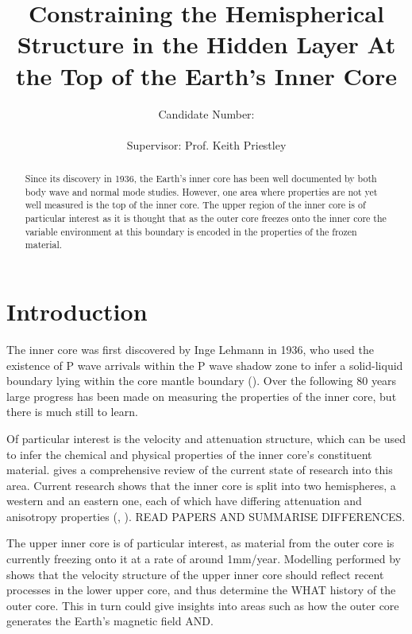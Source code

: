 \documentclass[11pt,a4paper]{article}
\begin{document}
\title{Constraining the Hemispherical Structure in the Hidden Layer At the Top of the Earth's Inner Core}
\author{Candidate Number: \\  \\ Supervisor: Prof. Keith Priestley}
\maketitle

\begin{abstract}
Since its discovery in 1936, the Earth's inner core has been well documented by both body wave and normal mode studies. However, one area where properties are not yet well measured is the top of the inner core. The upper region of the inner core is of particular interest as it is thought that as the outer core freezes onto the inner core the variable environment at this boundary is encoded in the properties of the frozen material. 
\end{abstract}

\tableofcontents

\newpage
\section{Introduction}
The inner core was first discovered by Inge Lehmann in 1936, who used the existence of P wave arrivals within the P wave shadow zone to infer a solid-liquid boundary lying within the core mantle boundary (\cite{Lehmann}). Over the following 80 years large progress has been made on measuring the properties of the inner core, but there is much still to learn.

Of particular interest is the velocity and attenuation structure, which can be used to infer the chemical and physical properties of the inner core's constituent material. \cite{Deuss2014} gives a comprehensive review of the current state of research into this area. Current research shows that the inner core is split into two hemispheres, a western and an eastern one, each of which have differing attenuation and anisotropy properties (\cite{Waszek2011a}, \cite{Waszek2013a}). READ PAPERS AND SUMMARISE DIFFERENCES.

The upper inner core is of particular interest, as material from the outer core is currently freezing onto it at a rate of around 1mm/year. Modelling performed by \cite{Deguen2009a} shows that the velocity structure of the upper inner core should reflect recent processes in the lower upper core, and thus determine the WHAT history of the outer core. This in turn could give insights into areas such as how the outer core generates the Earth's magnetic field AND. 
\end{document}
